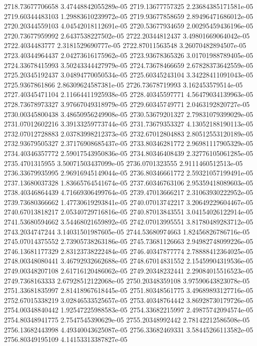 {2718.73677706658 3.47448842055289e-05
2719.13677757325 2.23684385171581e-05
2719.60344483103 1.29883610239972e-05
2719.93677858659 2.89496471686012e-05
2720.20344559103 4.04542018112691e-05
2720.53677934659 2.00295459436196e-05
2720.73677959992 2.6437538227502e-05
2722.20344812437 3.49801669064042e-05
2722.4034483777 2.3181529690777e-05
2722.87011563548 3.26070482894507e-05
2723.40344964437 2.04273616175962e-05
2723.93678365326 3.01701988789405e-05
2724.33678415993 3.50243344427979e-05
2724.73678466659 2.67828373642559e-05
2725.20345192437 3.04894770050534e-05
2725.60345243104 3.34228411091043e-05
2725.9367861866 2.86309624587381e-05
2726.73678719993 3.162453579514e-05
2727.40345471104 2.11664411925938e-05
2728.40345597771 4.56479034139963e-05
2728.73678973327 3.97667049318979e-05
2729.60345749771 2.0463192820727e-05
2730.00345800438 3.48650956249908e-05
2730.53679201327 2.79831079399029e-05
2731.07012602216 3.39133259773744e-05
2731.73679353327 4.13052188190113e-05
2732.07012728883 2.03783998212373e-05
2732.67012804883 2.80512553120189e-05
2732.93679505327 2.37176908685437e-05
2733.80346281772 2.96981117905329e-05
2734.40346357772 2.59017543950836e-05
2734.80346408439 2.32776105061285e-05
2735.4701315955 3.50071503437099e-05
2736.0701323555 2.9111460512513e-05
2736.33679935995 2.96916945149044e-05
2736.80346661772 2.59321057199491e-05
2737.13680037328 1.83665764541674e-05
2737.60346763106 2.95359418089603e-05
2738.40346864439 4.71669306499764e-05
2739.47013666217 2.31063930222952e-05
2739.73680366662 1.47730619293841e-05
2740.07013742217 3.20649229604467e-05
2740.67013818217 2.05340729716816e-05
2740.87013843551 3.04154026122914e-05
2741.53680594662 3.54468021659892e-05
2742.07013995551 3.81780489283712e-05
2743.2034747244 3.14031501987605e-05
2744.53680974663 1.82456826786716e-05
2745.07014375552 2.73905738263186e-05
2745.73681126663 2.94982748099226e-05
2746.13681177329 2.83123738222484e-05
2746.40347877774 2.78888412364025e-05
2748.00348080441 3.46792932662688e-05
2748.67014831552 2.15459904319536e-05
2749.00348207108 2.61716120486062e-05
2749.20348232441 2.29084015516523e-05
2749.7368163333 2.67928512122068e-05
2750.20348359108 3.97590643823078e-05
2751.33681835997 2.81418967618445e-05
2751.80348561775 3.49689893127716e-05
2752.67015338219 3.02846533525657e-05
2753.40348764442 3.86928730179726e-05
2754.00348840442 1.92547225988583e-05
2754.33682215997 2.49875742094574e-05
2754.80348941775 2.7547545390629e-05
2755.20348992442 2.78142212586508e-05
2756.13682443998 4.49340043625087e-05
2756.33682469331 3.58445266113582e-05
2756.80349195109 4.14153313387827e-05
}
